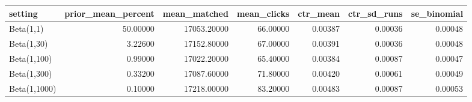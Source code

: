 \begin{tabular}{lrrrrrr}
\toprule
setting & prior\_mean\_percent & mean\_matched & mean\_clicks & ctr\_mean & ctr\_sd\_runs & se\_binomial \\
\midrule
Beta(1,1) & 50.00000 & 17053.20000 & 66.00000 & 0.00387 & 0.00036 & 0.00048 \\
Beta(1,30) & 3.22600 & 17152.80000 & 67.00000 & 0.00391 & 0.00036 & 0.00048 \\
Beta(1,100) & 0.99000 & 17022.20000 & 65.40000 & 0.00384 & 0.00087 & 0.00047 \\
Beta(1,300) & 0.33200 & 17087.60000 & 71.80000 & 0.00420 & 0.00061 & 0.00049 \\
Beta(1,1000) & 0.10000 & 17218.00000 & 83.20000 & 0.00483 & 0.00087 & 0.00053 \\
\bottomrule
\end{tabular}
